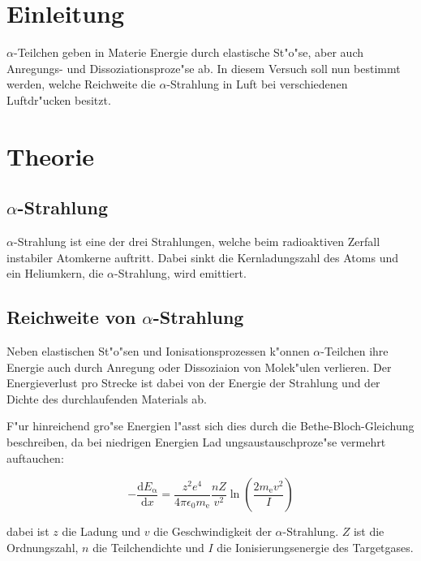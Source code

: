 \section{Einleitung} %
\label{sec:einleitung}

	
	$\alpha$-Teilchen geben in Materie Energie durch elastische St"o"se, aber auch Anregungs- und Dissoziationsproze"se ab. In diesem Versuch soll nun bestimmt werden, welche Reichweite die $\alpha$-Strahlung in Luft bei verschiedenen Luftdr"ucken besitzt.
	
\section{Theorie} %
\label{sec:theorie}

\subsection{$\alpha$-Strahlung} %
\label{sub:_alpha_strahlung}

$\alpha$-Strahlung ist eine der drei Strahlungen, welche beim radioaktiven Zerfall instabiler Atomkerne auftritt.
Dabei sinkt die Kernladungszahl des Atoms und ein Heliumkern, die $\alpha$-Strahlung, wird emittiert.

\subsection{Reichweite von $\alpha$-Strahlung} %
\label{sub:reichweite_von_alpha_strahlung}

Neben elastischen St"o"sen und Ionisationsprozessen k"onnen $\alpha$-Teilchen ihre Energie auch durch Anregung oder Dissoziaion von Molek"ulen verlieren. Der Energieverlust pro Strecke ist dabei von der Energie der Strahlung und der Dichte des durchlaufenden Materials ab.

F"ur hinreichend gro"se Energien l"asst sich dies durch die Bethe-Bloch-Gleichung beschreiben, da bei niedrigen Energien Lad
ungsaustauschproze"se vermehrt auftauchen:

\begin{equation}
	-\frac{\mathrm{d}E_\mathrm{\alpha}}{\mathrm{d}x} = \frac{z^2e^4}{4\pi \epsilon_\mathrm{0} m_\mathrm{e}} \frac{n Z}{v^2} \ln \left( \frac{2 m_\mathrm{e}v^2}{I} \right)
\end{equation}

dabei ist $z$ die Ladung und $v$ die Geschwindigkeit der $\alpha$-Strahlung. $Z$ ist die Ordnungszahl, $n$ die Teilchendichte und $I$ die Ionisierungsenergie des Targetgases.

